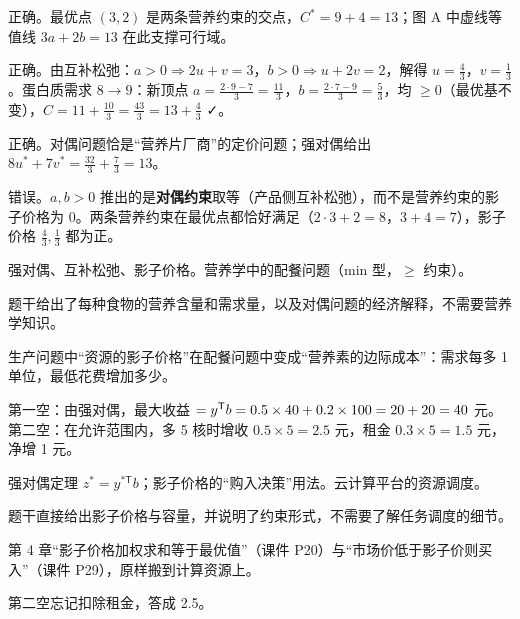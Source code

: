 正确。最优点 $(3,2)$ 是两条营养约束的交点，$C^*=9+4=13$；图 A 中虚线等值线 $3a+2b=13$ 在此支撑可行域。\par
{}正确。由互补松弛：$a>0\Rightarrow2u+v=3$，$b>0\Rightarrow u+2v=2$，解得 $u=\frac43$，$v=\frac13$。蛋白质需求 $8\to9$：新顶点 $a=\frac{2\cdot9-7}{3}=\frac{11}{3}$，$b=\frac{2\cdot7-9}{3}=\frac53$，均 $\ge0$（最优基不变），$C=11+\frac{10}{3}=\frac{43}{3}=13+\frac43$ ✓。\par
{}正确。对偶问题恰是“营养片厂商”的定价问题；强对偶给出 $8u^*+7v^*=\frac{32}{3}+\frac73=13$。\par
{}错误。$a,b>0$ 推出的是\textbf{对偶约束}取等（产品侧互补松弛），而不是营养约束的影子价格为 0。两条营养约束在最优点都恰好满足（$2\cdot3+2=8$，$3+4=7$），影子价格 $\frac43,\frac13$ 都为正。\par
{}强对偶、互补松弛、影子价格。\quad{}营养学中的配餐问题（min 型，$\ge$ 约束）。\par
{}题干给出了每种食物的营养含量和需求量，以及对偶问题的经济解释，不需要营养学知识。\par
{}生产问题中“资源的影子价格”在配餐问题中变成“营养素的边际成本”：需求每多 1 单位，最低花费增加多少。

\begin{figure}[!htbp]\centering
{}
\end{figure}
第一空：由强对偶，最大收益 $=y^{\mathsf T} b=0.5\times40+0.2\times100=20+20=40$ 元。第二空：在允许范围内，多 5 核时增收 $0.5\times5=2.5$ 元，租金 $0.3\times5=1.5$ 元，净增 1 元。\par
{}强对偶定理 $z^*=y^{*\mathsf T}b$；影子价格的“购入决策”用法。\quad{}云计算平台的资源调度。\par
{}题干直接给出影子价格与容量，并说明了约束形式，不需要了解任务调度的细节。\par
{}第 4 章“影子价格加权求和等于最优值”（课件 P20）与“市场价低于影子价则买入”（课件 P29），原样搬到计算资源上。\par
{}第二空忘记扣除租金，答成 2.5。

